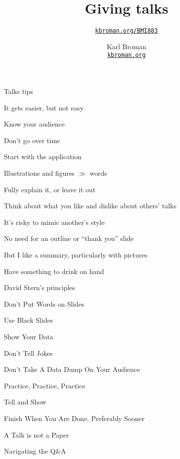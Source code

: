 \documentclass[aspectratio=169,12pt,t]{beamer}
\title{Giving talks}
\subtitle{}
\author{\href{https://kbroman.org/BMI883}{\tt kbroman.org/BMI883} }
\institute{}
\date{\small \hspace{3in} Karl Broman \\
  \hspace{3in} \href{https://kbroman.org}{\color{foreground}
    \small \tt kbroman.org}}
\begin{document}
\begin{frame}{Talks tips}

  \bi
\item It gets easier, but not easy
\item Know your audience
\item Don't go over time
\item Start with the application
\item Illustrations and figures $\gg$ words
\item Fully explain it, or leave it out
\item Think about what you like and dislike about others' talks
\item It's risky to mimic another's style
\item No need for an outline or ``thank you'' slide
  \bi
\item But I like a summary, particularly with pictures
  \ei
\item Have something to drink on hand
  \ei

\end{frame}


\begin{frame}{David Stern's principles}

\bigskip

  \be
\item Don't Put Words on Slides
\item Use Black Slides
\item Show Your Data
\item Don't Tell Jokes
\item Don't Take A Data Dump On Your Audience
\item Practice, Practice, Practice
\item Tell and Show
\item Finish When You Are Done, Preferably Sooner
  \ee

  \bigskip

  \bi
\item A Talk is not a Paper
\item Navigating the Q\&A
  \ei

\end{frame}
\end{document}
